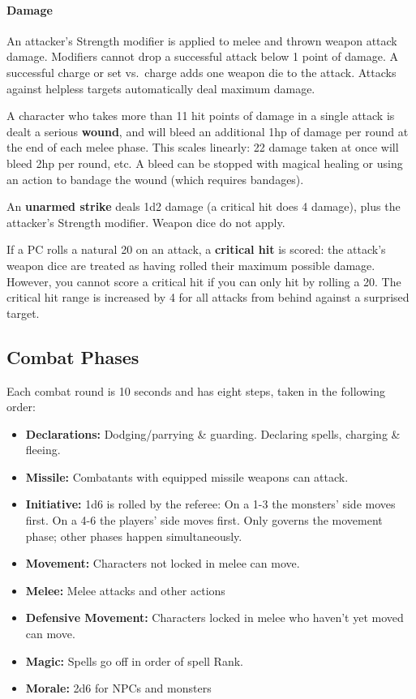 \documentclass{book}
\providecommand{\tightlist}{%
\setlength{\itemsep}{0pt}\setlength{\parskip}{0pt}}
\begin{document}
\paragraph{Damage}\label{damage}

An attacker's Strength modifier is applied to melee and thrown weapon
attack damage. Modifiers cannot drop a successful attack below 1 point
of damage. A successful charge or set vs.~charge adds one weapon die to
the attack. Attacks against helpless targets automatically deal maximum
damage.

A character who takes more than 11 hit points of damage in a single
attack is dealt a serious \textbf{wound}, and will bleed an additional
1hp of damage per round at the end of each melee phase. This scales
linearly: 22 damage taken at once will bleed 2hp per round, etc. A bleed
can be stopped with magical healing or using an action to bandage the
wound (which requires bandages).

An \textbf{unarmed strike} deals 1d2 damage (a critical hit does 4
damage), plus the attacker's Strength modifier. Weapon dice do not
apply.

If a PC rolls a natural 20 on an attack, a \textbf{critical hit} is
scored: the attack's weapon dice are treated as having rolled their
maximum possible damage. However, you cannot score a critical hit if you
can only hit by rolling a 20. The critical hit range is increased by 4
for all attacks from behind against a surprised target.

\subsection*{Combat Phases}\label{combat-phases}

Each combat round is 10 seconds and has eight steps, taken in the
following order:

\begin{itemize}
\tightlist
\item
  \textbf{Declarations:} Dodging/parrying \& guarding. Declaring spells,
  charging \& fleeing.
\item
  \textbf{Missile:} Combatants with equipped missile weapons can attack.
\item
  \textbf{Initiative:} 1d6 is rolled by the referee: On a 1-3 the
  monsters' side moves first. On a 4-6 the players' side moves first.
  Only governs the movement phase; other phases happen simultaneously.
\item
  \textbf{Movement:} Characters not locked in melee can move.
\item
  \textbf{Melee:} Melee attacks and other actions
\item
  \textbf{Defensive Movement:} Characters locked in melee who haven't
  yet moved can move.
\item
  \textbf{Magic:} Spells go off in order of spell Rank.
\item
  \textbf{Morale:} 2d6 for NPCs and monsters
\end{itemize}
\end{document}
